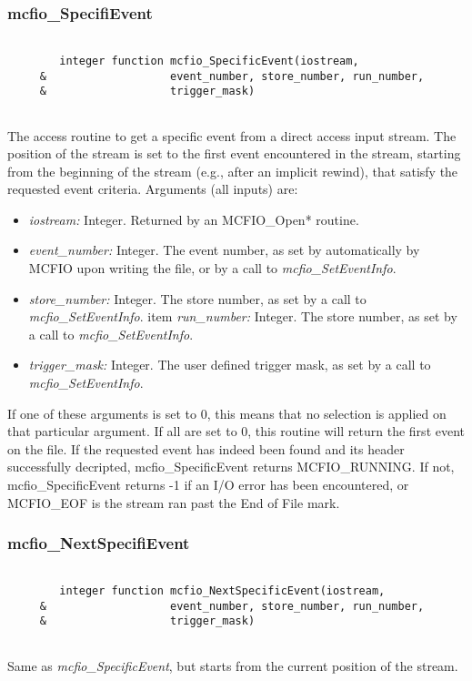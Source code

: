 \subsubsection{mcfio\_SpecifiEvent}

\begin{verbatim}

        integer function mcfio_SpecificEvent(iostream, 
     &                   event_number, store_number, run_number, 
     &                   trigger_mask)
	
\end{verbatim}
The access routine to get a specific event from a direct access input stream.
The position of the stream is set to the first event encountered in the stream, 
starting from the beginning of the stream (e.g., after an implicit rewind),
that satisfy the requested event criteria. Arguments (all inputs) are:
\begin{itemize}
\item  {\em iostream:} Integer.  Returned by an MCFIO\_Open* routine.
\item {\em event\_number:} Integer. The event number, as set by automatically
by MCFIO upon writing the file, or by a call to {\em  mcfio\_SetEventInfo}.
\item {\em store\_number:} Integer.  The store number, as set 
 by a call to {\em  mcfio\_SetEventInfo}.
item {\em run\_number:} Integer. The store number, as set 
 by a call to {\em  mcfio\_SetEventInfo}.
\item {\em trigger\_mask:} Integer. The user defined trigger mask, as set 
 by a call to {\em  mcfio\_SetEventInfo}.
\end{itemize}

If one of these arguments is set to 0, this means that no selection 
is applied on that particular  argument. If all are set to 0, this 
routine will return the first event on the file. 
If the requested event has indeed been found and its header 
successfully decripted, mcfio\_SpecificEvent returns 
MCFIO\_RUNNING.  If not, mcfio\_SpecificEvent returns -1 if an I/O error has 
been encountered, or MCFIO\_EOF is the stream ran past the 
End of File mark. 

\subsubsection{mcfio\_NextSpecifiEvent}

\begin{verbatim}

        integer function mcfio_NextSpecificEvent(iostream, 
     &                   event_number, store_number, run_number, 
     &                   trigger_mask)
	
\end{verbatim}
Same as {\em mcfio\_SpecificEvent}, but starts from the current
position of the stream. 
	
